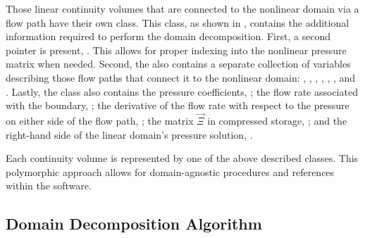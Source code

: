 Those linear continuity volumes that are connected to the nonlinear domain via a flow path have their own  class.
This class, as shown in , contains the additional information required to perform the domain decomposition.
First, a second  pointer is present, .
This allows for proper indexing into the nonlinear pressure matrix when needed.
Second, the  also contains a separate collection of variables describing those flow paths that connect it to the nonlinear domain: , , , , , , and .
Lastly, the  class also contains the pressure coefficients, ; the flow rate associated with the boundary, ; the derivative of the flow rate with respect to the pressure on either side of the flow path, ; the matrix $\vec{\Xi}$ in compressed storage, ; and the right-hand side of the linear domain's pressure solution, .

Each continuity volume is represented by one of the above described  classes.
This polymorphic approach allows for domain-agnostic procedures and references within the software.

\subsection{Domain Decomposition Algorithm}
\label{subsect:domDecompAlgorithm}


